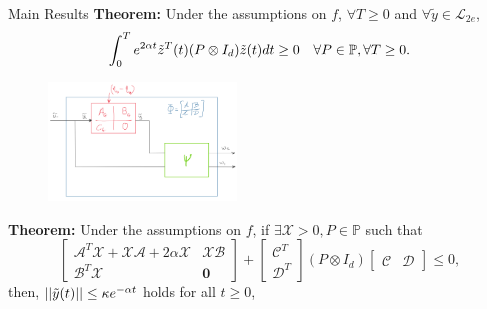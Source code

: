 \documentclass{beamer}
\begin{document}
\begin{frame}{Main Results}
\textbf{Theorem:} Under the assumptions on $f$, $\forall T \geq 0$ and $\forall \tilde{y} \in \mathcal{L}_{2e}$,	
	\begin{equation*}
		\int_0^T e^{2\alpha t}\Tilde{z}^T(t) (P \otimes I_d) \Tilde{z}(t) dt \geq 0 \quad \forall P \in \mathbb{P},\forall T \geq 0.
	\end{equation*}
\begin{figure}[t]
	\includegraphics[width=5cm]{figures/Psi_GI.PNG}
	\centering
\end{figure}
\textbf{Theorem:} Under the assumptions on $f$, if $\exists \mathcal{X}>0,P \in \mathbb{P}$ such that
\begin{equation*}\label{eq:perf_LMI}
	\begin{bmatrix}
		\mathcal{A}^T\mathcal{X}+\mathcal{X}\mathcal{A}+2\alpha \mathcal{X}  & \mathcal{X}\mathcal{B} \\
		\mathcal{B}^T\mathcal{X}    & \mathbf{0}
	\end{bmatrix}
	+
	\begin{bmatrix}
		\mathcal{C}^T \\
		\mathcal{D}^T 
	\end{bmatrix}
	( P\otimes I_d)
	\begin{bmatrix}
		\mathcal{C} & \mathcal{D} 
	\end{bmatrix}
	\leq 
	0,
\end{equation*}
then, $||\Tilde{y}(t)||\leq \kappa e^{-\alpha t}$ holds for all $t\geq 0$, 
\end{frame}
\end{document}
